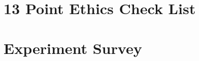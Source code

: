 \documentclass[11pt,openright,twoside,a4paper]{report}
\begin{document}
\appendix

\chapter{13 Point Ethics Check List}


\chapter{Experiment Survey}




\end{document}
